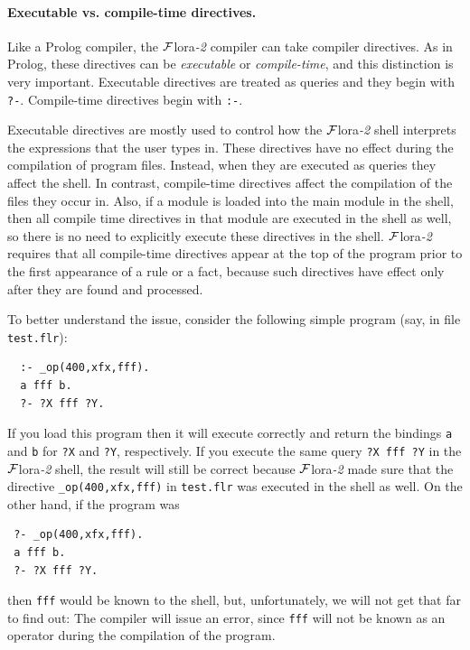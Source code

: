 \documentclass[11pt]{article}
\newcommand{\FLORA}{{\mbox{\sc ${\cal F}${lora}\rm\emph{-2}}}\xspace}
\begin{document}
\paragraph{Executable vs. compile-time directives.}
Like a Prolog compiler, the \FLORA compiler can take compiler directives.
As in Prolog, these directives can be \emph{executable} or
\emph{compile-time}, and this distinction is very important.
Executable directives are treated as queries and they begin with {\tt ?-}.
Compile-time directives begin with {\tt :-}.

Executable directives are mostly used to control how the \FLORA shell
interprets the expressions that the user types in. These directives have no
effect during the compilation of program files. Instead, when they are
executed as queries they affect the shell. In contrast, compile-time
directives affect the compilation of the files they occur in. Also, if a
module is loaded into the main module in the shell, then all compile time
directives in that module are executed in the shell as well, so there is no
need to explicitly execute these directives in the shell.
\FLORA requires
that all compile-time directives appear at the top of the program prior to
the first appearance of a rule or a fact, because such directives have
effect only after they are found and processed.

To better understand the issue, consider the following simple program
(say, in file {\tt test.flr}):
\begin{verbatim}
  :- _op(400,xfx,fff).
  a fff b.
  ?- ?X fff ?Y.
\end{verbatim}
If you load this program then it will execute correctly and return the
bindings {\tt a} and {\tt b} for {\tt ?X} and {\tt ?Y}, respectively.
If you execute the same query {\tt ?X fff ?Y} in the \FLORA shell,
the result will still be correct because \FLORA made sure that the
directive {\tt \_op(400,xfx,fff)} in
{\tt test.flr} was executed in the shell as well.
On the other hand, if the program was
\begin{verbatim}
 ?- _op(400,xfx,fff).
 a fff b.
 ?- ?X fff ?Y.
\end{verbatim}
then {\tt fff} would be known to the shell, but, unfortunately, we
will not get that far to find out: The compiler will issue an error, since
{\tt fff} will not be known as an operator during the compilation of the
program.
\end{document}
